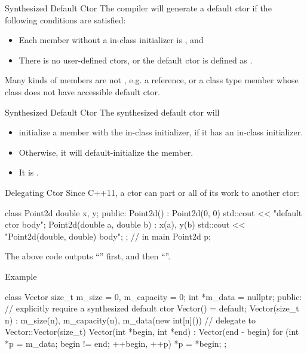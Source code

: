 \documentclass{beamer}
\begin{document}
\begin{frame}{Synthesized Default Ctor}
    The compiler will generate a default ctor if the following conditions are satisfied:
    \begin{itemize}
        \item Each member without a in-class initializer is , and
        \item There is no user-defined ctors, or the default ctor is defined as .
    \end{itemize}
    Many kinds of members are not , e.g. a reference, or a class type member whose class does not have accessible default ctor.
\end{frame}

\begin{frame}{Synthesized Default Ctor}
    The synthesized default ctor will
    \begin{itemize}
        \item initialize a member with the in-class initializer, if it has an in-class initializer.
        \item Otherwise, it will default-initialize the member.
        \item It is .
    \end{itemize}
\end{frame}

\begin{frame}[fragile]{Delegating Ctor}
    Since C++11, a ctor can  part or all of its work to another ctor:
    \begin{cpp}
class Point2d {
  double x, y;
 public:
  Point2d() : Point2d(0, 0) {
    std::cout << "default ctor body\n";
  }
  Point2d(double a, double b) : x(a), y(b) {
    std::cout << "Point2d(double, double) body\n";
  }
};
// in main
Point2d p;
    \end{cpp}
    The above code outputs ``'' first, and then ``''.
\end{frame}

\begin{frame}[fragile]{Example}
    \begin{cpp}
class Vector {
  size_t m_size = 0, m_capacity = 0;
  int *m_data = nullptr;
 public:
  // explicitly require a synthesized default ctor
  Vector() = default;
  Vector(size_t n) : m_size(n), m_capacity(n),
    m_data(new int[n]()) {}
  // delegate to Vector::Vector(size_t)
  Vector(int *begin, int *end) : Vector(end - begin) {
    for (int *p = m_data; begin != end; ++begin, ++p)
      *p = *begin;
  }
};
    \end{cpp}
\end{frame}
\end{document}
